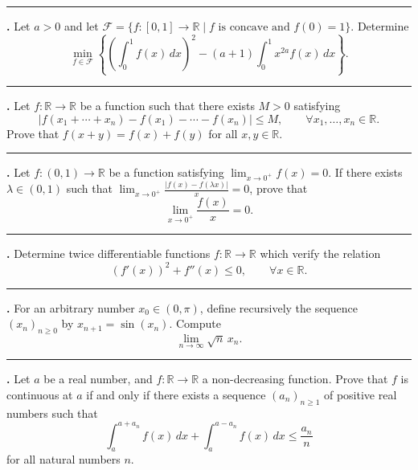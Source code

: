 \documentclass[11pt]{article}
\newcounter{probnum}
\newenvironment{problembox}{\par\noindent\rule{\linewidth}{0.5pt}\vspace{5pt}\par}{\vspace{2pt}}
\begin{document}
\begin{problembox}
\textbf{\theprobnum.} Let $a > 0$ and let $\mathcal{F} = \{f : [0,1] \to \mathbb{R} \mid f \text{ is concave and } f(0) = 1\}$. Determine
\[
\min_{f \in \mathcal{F}} \left\{ \left(\int_0^1 f(x)\,dx\right)^2 - (a+1) \int_0^1 x^{2a} f(x)\,dx \right\}.
\]
\end{problembox}

\begin{problembox}
\textbf{\theprobnum.} Let $f : \mathbb{R} \to \mathbb{R}$ be a function such that there exists $M > 0$ satisfying
\[
|f(x_1 + \cdots + x_n) - f(x_1) - \cdots - f(x_n)| \le M, \qquad \forall x_1, \ldots, x_n \in \mathbb{R}.
\]
Prove that $f(x+y) = f(x) + f(y)$ for all $x, y \in \mathbb{R}$.
\end{problembox}

\begin{problembox}
\textbf{\theprobnum.} Let $f : (0,1) \to \mathbb{R}$ be a function satisfying $\displaystyle\lim_{x \to 0^+} f(x) = 0$. If there exists $\lambda \in (0,1)$ such that $\displaystyle\lim_{x \to 0^+} \frac{|f(x) - f(\lambda x)|}{x} = 0$, prove that
\[
\lim_{x \to 0^+} \frac{f(x)}{x} = 0.
\]
\end{problembox}

\begin{problembox}
\textbf{\theprobnum.} Determine twice differentiable functions $f : \mathbb{R} \to \mathbb{R}$ which verify the relation
\[
(f'(x))^2 + f''(x) \le 0, \qquad \forall x \in \mathbb{R}.
\]
\end{problembox}

\begin{problembox}
\textbf{\theprobnum.} For an arbitrary number $x_0 \in (0,\pi)$, define recursively the sequence $(x_n)_{n \ge 0}$ by $x_{n+1} = \sin(x_n)$. Compute
\[
\lim_{n \to \infty} \sqrt{n}\, x_n.
\]
\end{problembox}

\begin{problembox}
\textbf{\theprobnum.} Let $a$ be a real number, and $f : \mathbb{R} \to \mathbb{R}$ a non-decreasing function. Prove that $f$ is continuous at $a$ if and only if there exists a sequence $(a_n)_{n \ge 1}$ of positive real numbers such that
\[
\int_a^{a+a_n} f(x)\,dx + \int_a^{a-a_n} f(x)\,dx \le \frac{a_n}{n}
\]
for all natural numbers $n$.
\end{problembox}
\end{document}
